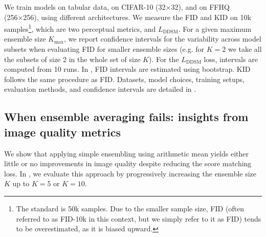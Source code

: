 \documentclass[10pt]{article} %
\newcommand{\DDSM}{\text{DDSM}}
\begin{document}
We train models on tabular data, on CIFAR-10 (32×32), and on FFHQ (256×256), using different architectures. We measure the FID and KID on 10k samples\footnote{ The standard is 50k samples. Due to the smaller sample size, FID (often referred to as FID-10k in this context, but we simply refer to it as FID) tends to be overestimated, as it is biased upward.}, which are two perceptual metrics, and $L_\DDSM$.
For a given maximum ensemble size $K_{\text{max}}$, we report confidence intervals for the variability across model subsets when evaluating FID for smaller ensemble sizes (e.g. for $K=2$ we take all the subsets of size 2 in the whole set of size $K$). 
For the $L_\DDSM$ loss, intervals are computed from 10 runs. In , FID intervals are estimated using bootstrap. KID follows the same procedure as FID. Datasets, model choices, training setups, evaluation methods, and confidence intervals are detailed in .


\subsection{When ensemble averaging fails: insights from image quality metrics}\label{section: averaging fails}

We show that applying simple ensembling using arithmetic mean yields either little or no improvements in image quality despite reducing the score matching loss.
In , we evaluate this approach by progressively increasing the ensemble size $K$ up to $K=5$ or $K=10$.
\end{document}
